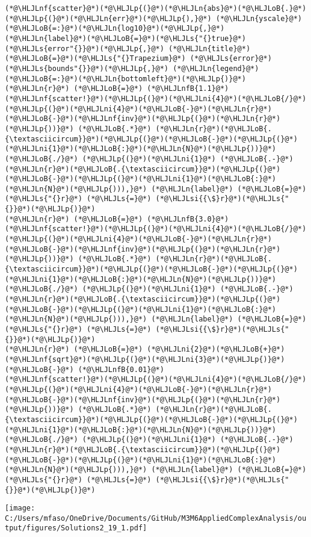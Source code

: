 \documentclass[12pt,a4paper]{article}
\newcommand{\HLJLn}[1]{#1}
\newcommand{\HLJLnf}[1]{\textcolor[RGB]{66,102,213}{#1}}
\newcommand{\HLJLs}[1]{\textcolor[RGB]{201,61,57}{#1}}
\newcommand{\HLJLsi}[1]{#1}
\newcommand{\HLJLnfB}[1]{\textcolor[RGB]{59,151,46}{#1}}
\newcommand{\HLJLni}[1]{\textcolor[RGB]{59,151,46}{#1}}
\newcommand{\HLJLoB}[1]{\textcolor[RGB]{102,102,102}{\textbf{#1}}}
\newcommand{\HLJLp}[1]{#1}
\begin{document}
\begin{lstlisting}
(*@\HLJLnf{scatter}@*)(*@\HLJLp{(}@*)(*@\HLJLn{abs}@*)(*@\HLJLoB{.}@*)(*@\HLJLp{(}@*)(*@\HLJLn{err}@*)(*@\HLJLp{),}@*) (*@\HLJLn{yscale}@*)(*@\HLJLoB{=:}@*)(*@\HLJLn{log10}@*)(*@\HLJLp{,}@*) (*@\HLJLn{label}@*)(*@\HLJLoB{=}@*)(*@\HLJLs{"{}true}@*) (*@\HLJLs{error"{}}@*)(*@\HLJLp{,}@*) (*@\HLJLn{title}@*)(*@\HLJLoB{=}@*)(*@\HLJLs{"{}Trapezium}@*) (*@\HLJLs{error}@*) (*@\HLJLs{bounds"{}}@*)(*@\HLJLp{,}@*) (*@\HLJLn{legend}@*)(*@\HLJLoB{=:}@*)(*@\HLJLn{bottomleft}@*)(*@\HLJLp{)}@*)
(*@\HLJLn{r}@*) (*@\HLJLoB{=}@*) (*@\HLJLnfB{1.1}@*)
(*@\HLJLnf{scatter!}@*)(*@\HLJLp{(}@*)(*@\HLJLni{4}@*)(*@\HLJLoB{/}@*)(*@\HLJLp{(}@*)(*@\HLJLni{4}@*)(*@\HLJLoB{-}@*)(*@\HLJLn{r}@*)(*@\HLJLoB{-}@*)(*@\HLJLnf{inv}@*)(*@\HLJLp{(}@*)(*@\HLJLn{r}@*)(*@\HLJLp{))}@*) (*@\HLJLoB{.*}@*) (*@\HLJLn{r}@*)(*@\HLJLoB{.{\textasciicircum}}@*)(*@\HLJLp{(}@*)(*@\HLJLoB{-}@*)(*@\HLJLp{(}@*)(*@\HLJLni{1}@*)(*@\HLJLoB{:}@*)(*@\HLJLn{N}@*)(*@\HLJLp{))}@*) (*@\HLJLoB{./}@*) (*@\HLJLp{(}@*)(*@\HLJLni{1}@*) (*@\HLJLoB{.-}@*) (*@\HLJLn{r}@*)(*@\HLJLoB{.{\textasciicircum}}@*)(*@\HLJLp{(}@*)(*@\HLJLoB{-}@*)(*@\HLJLp{(}@*)(*@\HLJLni{1}@*)(*@\HLJLoB{:}@*)(*@\HLJLn{N}@*)(*@\HLJLp{))),}@*) (*@\HLJLn{label}@*) (*@\HLJLoB{=}@*) (*@\HLJLs{"{}r}@*) (*@\HLJLs{=}@*) (*@\HLJLsi{{\$}r}@*)(*@\HLJLs{"{}}@*)(*@\HLJLp{)}@*)
(*@\HLJLn{r}@*) (*@\HLJLoB{=}@*) (*@\HLJLnfB{3.0}@*)
(*@\HLJLnf{scatter!}@*)(*@\HLJLp{(}@*)(*@\HLJLni{4}@*)(*@\HLJLoB{/}@*)(*@\HLJLp{(}@*)(*@\HLJLni{4}@*)(*@\HLJLoB{-}@*)(*@\HLJLn{r}@*)(*@\HLJLoB{-}@*)(*@\HLJLnf{inv}@*)(*@\HLJLp{(}@*)(*@\HLJLn{r}@*)(*@\HLJLp{))}@*) (*@\HLJLoB{.*}@*) (*@\HLJLn{r}@*)(*@\HLJLoB{.{\textasciicircum}}@*)(*@\HLJLp{(}@*)(*@\HLJLoB{-}@*)(*@\HLJLp{(}@*)(*@\HLJLni{1}@*)(*@\HLJLoB{:}@*)(*@\HLJLn{N}@*)(*@\HLJLp{))}@*) (*@\HLJLoB{./}@*) (*@\HLJLp{(}@*)(*@\HLJLni{1}@*) (*@\HLJLoB{.-}@*) (*@\HLJLn{r}@*)(*@\HLJLoB{.{\textasciicircum}}@*)(*@\HLJLp{(}@*)(*@\HLJLoB{-}@*)(*@\HLJLp{(}@*)(*@\HLJLni{1}@*)(*@\HLJLoB{:}@*)(*@\HLJLn{N}@*)(*@\HLJLp{))),}@*) (*@\HLJLn{label}@*) (*@\HLJLoB{=}@*) (*@\HLJLs{"{}r}@*) (*@\HLJLs{=}@*) (*@\HLJLsi{{\$}r}@*)(*@\HLJLs{"{}}@*)(*@\HLJLp{)}@*)
(*@\HLJLn{r}@*) (*@\HLJLoB{=}@*) (*@\HLJLni{2}@*)(*@\HLJLoB{+}@*)(*@\HLJLnf{sqrt}@*)(*@\HLJLp{(}@*)(*@\HLJLni{3}@*)(*@\HLJLp{)}@*)  (*@\HLJLoB{-}@*) (*@\HLJLnfB{0.01}@*)
(*@\HLJLnf{scatter!}@*)(*@\HLJLp{(}@*)(*@\HLJLni{4}@*)(*@\HLJLoB{/}@*)(*@\HLJLp{(}@*)(*@\HLJLni{4}@*)(*@\HLJLoB{-}@*)(*@\HLJLn{r}@*)(*@\HLJLoB{-}@*)(*@\HLJLnf{inv}@*)(*@\HLJLp{(}@*)(*@\HLJLn{r}@*)(*@\HLJLp{))}@*) (*@\HLJLoB{.*}@*) (*@\HLJLn{r}@*)(*@\HLJLoB{.{\textasciicircum}}@*)(*@\HLJLp{(}@*)(*@\HLJLoB{-}@*)(*@\HLJLp{(}@*)(*@\HLJLni{1}@*)(*@\HLJLoB{:}@*)(*@\HLJLn{N}@*)(*@\HLJLp{))}@*) (*@\HLJLoB{./}@*) (*@\HLJLp{(}@*)(*@\HLJLni{1}@*) (*@\HLJLoB{.-}@*) (*@\HLJLn{r}@*)(*@\HLJLoB{.{\textasciicircum}}@*)(*@\HLJLp{(}@*)(*@\HLJLoB{-}@*)(*@\HLJLp{(}@*)(*@\HLJLni{1}@*)(*@\HLJLoB{:}@*)(*@\HLJLn{N}@*)(*@\HLJLp{))),}@*) (*@\HLJLn{label}@*) (*@\HLJLoB{=}@*) (*@\HLJLs{"{}r}@*) (*@\HLJLs{=}@*) (*@\HLJLsi{{\$}r}@*)(*@\HLJLs{"{}}@*)(*@\HLJLp{)}@*)
\end{lstlisting}

\texttt{[image: C:/Users/mfaso/OneDrive/Documents/GitHub/M3M6AppliedComplexAnalysis/output/figures/Solutions2\_19\_1.pdf]}
\end{document}
